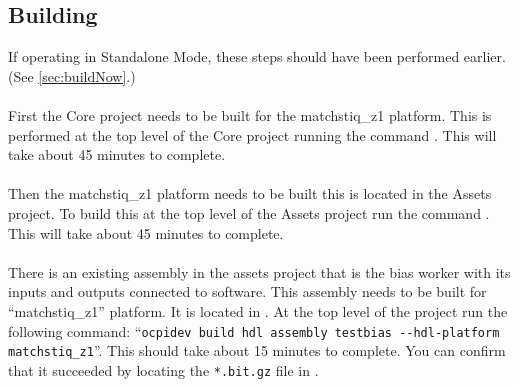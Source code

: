 \subsection{Building}
\label{sec:buildverify}
If operating in Standalone Mode, these steps should have been performed earlier. (See \ref{sec:buildNow}.)
\\ \\
First the Core project needs to be built for the matchstiq\_z1 platform.  This is performed at the top level of the Core project running the command .  This will take about  45 minutes to complete.    
\\ \\
Then the matchstiq\_z1 platform needs to be built this is located in the Assets project.  To build this at the top level of the Assets project run the command .  This will take about 45 minutes to complete.
\\ \\
There is an existing assembly in the assets project that is the bias worker with its inputs and outputs connected to software.  This assembly needs to be built for ``matchstiq\_z1'' platform. It is located in .  At the top level of the project run the following command: ``\texttt{ocpidev build hdl assembly testbias -\--hdl-platform matchstiq\_z1}''.  This should take about 15 minutes to complete. You can confirm that it succeeded by locating the \texttt{*.bit.gz} file in .\\


